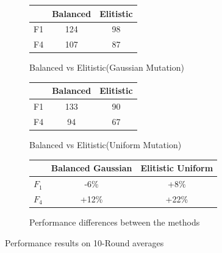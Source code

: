 \documentclass[openany]{article}
\begin{document}
				\begin{figure}[H]
					\centering
					\begin{subfigure}{.5\textwidth}
						\centering
						\begin{center}
							\begin{tabular}{||c c c||} 
								\hline
								  & Balanced & Elitistic \\ [0.5ex] 
								\hline\hline
								F1 & 124 & 98 \\ 
								\hline
								F4 & 107 & 87 \\
								\hline
							\end{tabular}
						\end{center}
						\caption{Balanced vs Elitistic(Gaussian Mutation)}
						\label{fig:sub1}
					\end{subfigure}%
					\begin{subfigure}{.5\textwidth}
						\centering
						\begin{center}
							\begin{tabular}{||c c c||} 
								\hline
								& Balanced & Elitistic \\ [0.5ex] 
								\hline\hline
								F1 & 133 & 90 \\ 
								\hline
								F4 & 94 & 67 \\
								\hline
							\end{tabular}
						\end{center}
						\caption{Balanced vs Elitistic(Uniform Mutation)}
						\label{fig:sub2}
					
					\end{subfigure}
					\begin{subfigure}{.5\textwidth}
						\centering
						\begin{center}
							\begin{tabular}{||c c c||} 
								\hline
								& Balanced Gaussian & Elitistic Uniform \\ [0.5ex] 
								\hline\hline
								$F_1$ & -6\% & +8\% \\ 
								\hline
								$F_4$ & +12\% & +22\% \\
								\hline
							\end{tabular}
						\end{center}
						\caption{Performance differences between the methods}
						\label{fig:sub2}
					\end{subfigure}
					
					\caption{Performance results on 10-Round averages}
					\label{fig:test}
				\end{figure}
				
\end{document}
